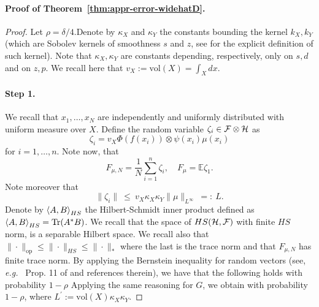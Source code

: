 \paragraph{Proof of Theorem~\ref{thm:appr-error-widehatD}.}
\begin{proof}
Let $\rho = \delta/4$.Denote by $\kappa_X$ and $\kappa_Y$ the constants bounding the kernel $k_X, k_Y$ (which are Sobolev kernels of smoothness $s$ and $z$, see \citet{wendland2004scattered} for the explicit definition of such kernel). Note that $\kappa_X, \kappa_Y$ are constants depending, respectively, only on $s, d$ and on $z, p$.
We recall here that $v_X := \textrm{vol}(X) = \int_X dx$.

\paragraph{Step 1. }
We recall that $x_1,\dots,x_N$ are independently and uniformly distributed with uniform measure over $X$.
Define the random variable $\zeta_i \in {\cal F} \otimes \mathcal H$ as
$$\zeta_i = v_X \Phi(f(x_i)) \otimes \psi(x_i) \mu(x_i)$$
for $i=1,\dots,n$. Note now, that
$$F_{\mu, N} = \frac{1}{N} \sum_{i=1}^n \zeta_i, \quad F_\mu = \mathbb{E} \zeta_1.$$
Note moreover that
$$\|\zeta_i\| ~\leq~ v_X \kappa_X \kappa_Y \|\mu\|_{L^\infty} ~=:~ L.$$
Denote by $\left\langle{A},{B}\right\rangle_{HS}$ the Hilbert-Schmidt inner product defined as $\left\langle{A},{B}\right\rangle_{HS} = \operatorname{Tr}(A^*B)$. We recall that the space of $HS(\mathcal H,{\cal F})$ with finite $HS$ norm, is a separable Hilbert space. We recall also that $\|\cdot\|_{\mathrm{op}} \leq \|\cdot\|_{HS} \leq \|\cdot\|_*$ where the last is the trace norm and that $F_{\mu, N}$ has finite trace norm.
By applying the Bernstein inequality for random vectors (see, \emph{e.g.\ } Prop. 11 of \citet{rudi2015less} and references therein), we have that the following holds with probability $1-\rho$
Applying the same reasoning for $G$, we obtain
with probability $1-\rho$, where $L^\prime := \textrm{vol}(X)\kappa_X \kappa_Y.$


\end{proof}
